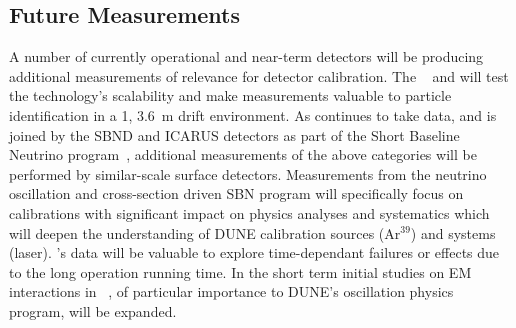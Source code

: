 \subsection{Future Measurements}
A number of currently operational and near-term  detectors will be producing additional measurements of relevance for detector calibration. The ~\cite{Abi:2017aow} and  %
will test the technology's scalability and make measurements valuable to particle identification in a \SI{1}{\kt}, \SI{3.6}{\m} drift environment. 
As  continues to take data, and is joined by the SBND and ICARUS detectors as part of the Short Baseline Neutrino program~\cite{Antonello:2015lea}, additional measurements of the above categories will be performed by similar-scale surface detectors. Measurements from the neutrino oscillation and cross-section driven SBN program will specifically focus on calibrations with significant impact on physics analyses and systematics which will deepen the understanding of DUNE calibration sources (Ar${}^{39}$) and systems (laser).
's data will be  valuable to explore time-dependant failures or effects due to the long operation running time. In the short term initial studies on EM interactions in ~\cite{Caratelli:2018nob}, of particular importance to DUNE's oscillation physics program, will be expanded.
